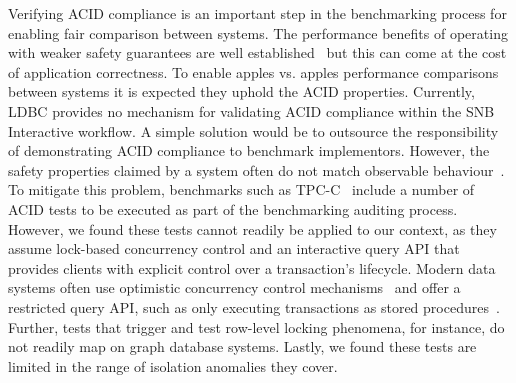 Verifying ACID compliance is an important step in the benchmarking process for enabling fair comparison between systems.
The performance benefits of operating with weaker safety guarantees are well established~\cite{DBLP:conf/ds/GrayLPT76} but this can come at the cost of application correctness.
To enable apples vs. apples performance comparisons between systems it is expected they uphold the ACID properties.
Currently, LDBC provides no mechanism for validating ACID compliance within the SNB Interactive workflow.
A simple solution would be to outsource the responsibility of demonstrating ACID compliance to benchmark implementors.
However, the safety properties claimed by a system often do not match observable behaviour~\cite{kingsbury}.
To mitigate this problem, benchmarks such as \mbox{TPC-C}~\cite{tpcc} include a number of ACID tests to be executed as part of the benchmarking auditing process.
However, we found these tests cannot readily be applied to our context, as they assume lock-based concurrency control and an interactive query API that provides clients with explicit control over a transaction's lifecycle.
Modern data systems often use optimistic concurrency control mechanisms~\cite{DBLP:journals/sigmod/PavloA16} and offer a restricted query API, such as only executing transactions as stored procedures~\cite{DBLP:conf/vldb/StonebrakerMAHHH07}.
Further, tests that trigger and test row-level locking phenomena, for instance, do not readily map on graph database systems.
Lastly, we found these tests are limited in the range of isolation anomalies they cover.

